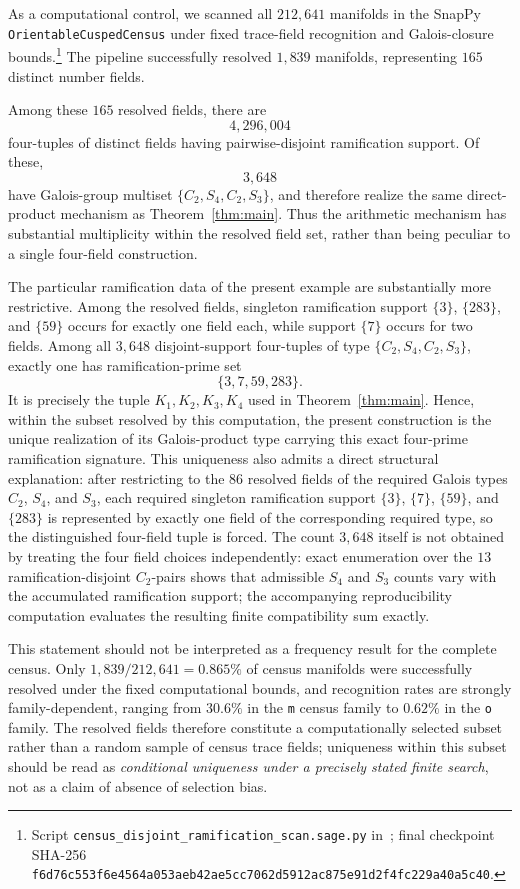 \documentclass[12pt]{amsart}
\begin{document}
As a computational control, we scanned all $212{,}641$ manifolds in the
SnapPy \texttt{OrientableCuspedCensus} under fixed trace-field
recognition and Galois-closure bounds.\footnote{Script
\texttt{census\_disjoint\_ramification\_scan.sage.py}
in~\cite{HFGcode}; final checkpoint SHA-256
\texttt{f6d76c553f6e4564a053aeb42ae5cc7062d5912ac875e91d2f4fc229a40a5c40}.}
The pipeline successfully resolved $1{,}839$ manifolds, representing
$165$ distinct number fields.

Among these $165$ resolved fields, there are
\[
4{,}296{,}004
\]
four-tuples of distinct fields having pairwise-disjoint ramification
support. Of these,
\[
3{,}648
\]
have Galois-group multiset $\{C_2,S_4,C_2,S_3\}$, and therefore realize
the same direct-product mechanism as Theorem~\ref{thm:main}. Thus the
arithmetic mechanism has substantial multiplicity within the resolved
field set, rather than being peculiar to a single four-field
construction.

The particular ramification data of the present example are
substantially more restrictive. Among the resolved fields, singleton
ramification support $\{3\}$, $\{283\}$, and $\{59\}$ occurs for
exactly one field each, while support $\{7\}$ occurs for two fields.
Among all $3{,}648$ disjoint-support four-tuples of type
$\{C_2,S_4,C_2,S_3\}$, exactly one has ramification-prime set
\[
\boxed{\{3,7,59,283\}}.
\]
It is precisely the tuple $K_1,K_2,K_3,K_4$ used in
Theorem~\ref{thm:main}. Hence, within the subset resolved by this
computation, the present construction is the unique realization of its
Galois-product type carrying this exact four-prime ramification
signature. This uniqueness also admits a direct structural
explanation: after restricting to the $86$ resolved fields of the
required Galois types $C_2$, $S_4$, and $S_3$, each required singleton
ramification support $\{3\}$, $\{7\}$, $\{59\}$, and $\{283\}$ is
represented by exactly one field of the corresponding required type,
so the distinguished four-field tuple is forced. The count $3{,}648$
itself is not obtained by treating the four field choices
independently: exact enumeration over the $13$ ramification-disjoint
$C_2$-pairs shows that admissible $S_4$ and $S_3$ counts vary with the
accumulated ramification support; the accompanying reproducibility
computation evaluates the resulting finite compatibility sum exactly.

This statement should not be interpreted as a frequency result for the
complete census. Only $1{,}839/212{,}641=0.865\%$ of census manifolds
were successfully resolved under the fixed computational bounds, and
recognition rates are strongly family-dependent, ranging from $30.6\%$
in the \texttt{m} census family to $0.62\%$ in the \texttt{o} family.
The resolved fields therefore constitute a computationally selected
subset rather than a random sample of census trace fields; uniqueness
within this subset should be read as \emph{conditional uniqueness under
a precisely stated finite search}, not as a claim of absence of
selection bias.
\end{document}
